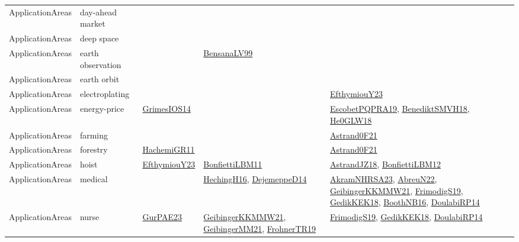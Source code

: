 {\begin{longtable}{lp{3cm}>{\raggedright}p{6cm}>{\raggedright}p{6cm}p{8cm}}
ApplicationAreas & day-ahead market &  &  & \\
ApplicationAreas & deep space &  &  & \\
ApplicationAreas & earth observation &  & \href{articles/BensanaLV99.pdf}{BensanaLV99}\cite{BensanaLV99} & \\
ApplicationAreas & earth orbit &  &  & \\
ApplicationAreas & electroplating &  &  & \href{papers/EfthymiouY23.pdf}{EfthymiouY23}\cite{EfthymiouY23}\\
ApplicationAreas & energy-price & \href{articles/GrimesIOS14.pdf}{GrimesIOS14}\cite{GrimesIOS14} &  & \href{articles/EscobetPQPRA19.pdf}{EscobetPQPRA19}\cite{EscobetPQPRA19}, \href{papers/BenediktSMVH18.pdf}{BenediktSMVH18}\cite{BenediktSMVH18}, \href{papers/He0GLW18.pdf}{He0GLW18}\cite{He0GLW18}\\
ApplicationAreas & farming &  &  & \href{papers/Astrand0F21.pdf}{Astrand0F21}\cite{Astrand0F21}\\
ApplicationAreas & forestry & \href{articles/HachemiGR11.pdf}{HachemiGR11}\cite{HachemiGR11} &  & \href{papers/Astrand0F21.pdf}{Astrand0F21}\cite{Astrand0F21}\\
ApplicationAreas & hoist & \href{papers/EfthymiouY23.pdf}{EfthymiouY23}\cite{EfthymiouY23} & \href{papers/BonfiettiLBM11.pdf}{BonfiettiLBM11}\cite{BonfiettiLBM11} & \href{papers/AstrandJZ18.pdf}{AstrandJZ18}\cite{AstrandJZ18}, \href{papers/BonfiettiLBM12.pdf}{BonfiettiLBM12}\cite{BonfiettiLBM12}\\
ApplicationAreas & medical &  & \href{papers/HechingH16.pdf}{HechingH16}\cite{HechingH16}, \href{papers/DejemeppeD14.pdf}{DejemeppeD14}\cite{DejemeppeD14} & \href{articles/AkramNHRSA23.pdf}{AkramNHRSA23}\cite{AkramNHRSA23}, \href{articles/AbreuN22.pdf}{AbreuN22}\cite{AbreuN22}, \href{papers/GeibingerKKMMW21.pdf}{GeibingerKKMMW21}\cite{GeibingerKKMMW21}, \href{papers/FrimodigS19.pdf}{FrimodigS19}\cite{FrimodigS19}, \href{articles/GedikKEK18.pdf}{GedikKEK18}\cite{GedikKEK18}, \href{papers/BoothNB16.pdf}{BoothNB16}\cite{BoothNB16}, \href{papers/DoulabiRP14.pdf}{DoulabiRP14}\cite{DoulabiRP14}\\
ApplicationAreas & nurse & \href{articles/GurPAE23.pdf}{GurPAE23}\cite{GurPAE23} & \href{papers/GeibingerKKMMW21.pdf}{GeibingerKKMMW21}\cite{GeibingerKKMMW21}, \href{papers/GeibingerMM21.pdf}{GeibingerMM21}\cite{GeibingerMM21}, \href{papers/FrohnerTR19.pdf}{FrohnerTR19}\cite{FrohnerTR19} & \href{papers/FrimodigS19.pdf}{FrimodigS19}\cite{FrimodigS19}, \href{articles/GedikKEK18.pdf}{GedikKEK18}\cite{GedikKEK18}, \href{papers/DoulabiRP14.pdf}{DoulabiRP14}\cite{DoulabiRP14}\\

\end{longtable}}
